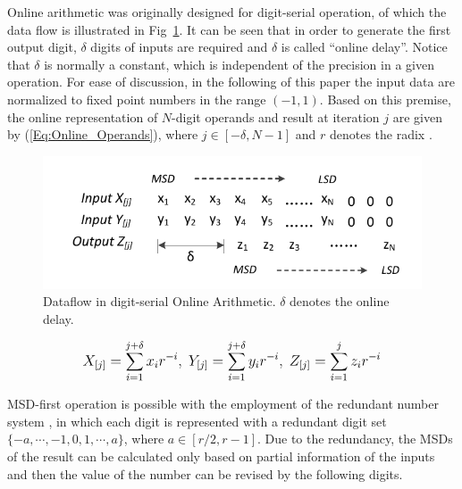 \documentclass[conference]{IEEEtran}
\begin{document}
Online arithmetic was originally designed for digit-serial operation, of which the data flow is illustrated in Fig~\ref{Fig:OnlineDataFlow}. It can be seen that in order to generate the first output digit, $\delta$ digits of inputs are required and $\delta$ is called ``online delay''. Notice that $\delta$ is normally a constant, which is independent of the precision in a given operation. For ease of discussion, in the following of this paper the input data are normalized to fixed point numbers in the range $(-1,1)$. Based on this premise, the online representation of $N$-digit operands and result at iteration $j$ are given by (\ref{Eq:Online_Operands}), where $j\in[-\delta,N-1]$ and $r$ denotes the radix \cite{Ercegovac_Book}.

\begin{figure}[htbp]
  \centering
  \includegraphics[width=.48\textwidth]{./Figures/OnlineArithmetic_DataFlow.pdf}
  \caption{Dataflow in digit-serial Online Arithmetic. $\delta$ denotes the online delay.}
  \label{Fig:OnlineDataFlow}
\end{figure}

\begin{eqnarray}\label{Eq:Online_Operands}
\footnotesize
  X_{[j]}=\sum_{i=1}^{j+\delta}x_ir^{-i},~Y_{[j]}=\sum_{i=1}^{j+\delta}y_ir^{-i},~Z_{[j]}=\sum_{i=1}^{j}z_ir^{-i}
\normalsize
\end{eqnarray}

MSD-first operation is possible with the employment of the redundant number system \cite{RedundantNumber}, in which each digit is represented with a redundant digit set $\{-a, \cdots,-1,0, 1, \cdots, a\}$, where $a\in[r/2,r-1]$. Due to the redundancy, the MSDs of the result can be calculated only based on partial information of the inputs and then the value of the number can be revised by the following digits.
\end{document}
